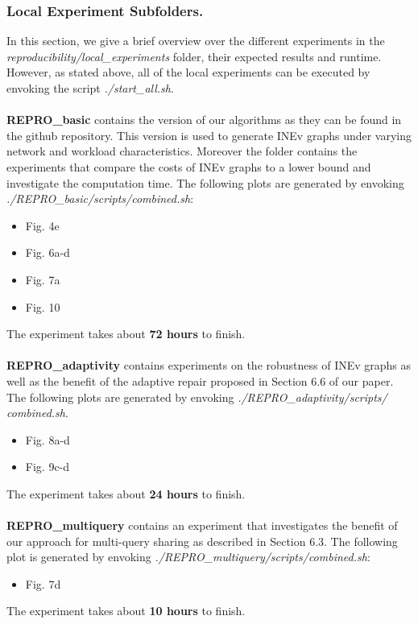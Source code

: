 \documentclass{article}
\begin{document}
\subsubsection{Local Experiment Subfolders.}
In this section, we give a brief overview over the different experiments in the \textit{reproducibility/local\_experiments} folder, their expected results and runtime. However, as stated above, all of the local experiments can be executed by envoking the script \textit{./start\_all.sh}.
\\
\\
\textbf{REPRO\_basic} contains the version of our algorithms as they can be found in the github repository. This version is used to generate INEv graphs under varying network and workload characteristics. Moreover the folder contains the experiments that compare the costs of INEv graphs to a lower bound and investigate the computation time. The following plots are generated by envoking \textit{./REPRO\_basic/scripts/combined.sh}:
\begin{itemize}
\item Fig. 4e
\item Fig. 6a-d
\item Fig. 7a
\item Fig. 10
\end{itemize}
The experiment takes about \textbf{72 hours} to finish.
\\
\\
\textbf{REPRO\_adaptivity} contains experiments on the robustness of INEv graphs as well as the benefit of the adaptive repair proposed in Section 6.6 of our paper.
The following plots are generated by envoking
\textit{./REPRO\_adaptivity/scripts/\\combined.sh}.
\begin{itemize}
\item Fig. 8a-d
\item Fig. 9c-d
\end{itemize}
The experiment takes about \textbf{24 hours} to finish.
\\
\\
\textbf{REPRO\_multiquery} contains an experiment that investigates the benefit of our approach for multi-query sharing as described in Section 6.3.
The following plot is generated by envoking \textit{./REPRO\_multiquery/scripts/combined.sh}:
\begin{itemize}
\item Fig. 7d
\end{itemize}
The experiment takes about \textbf{10 hours} to finish.
\end{document}
